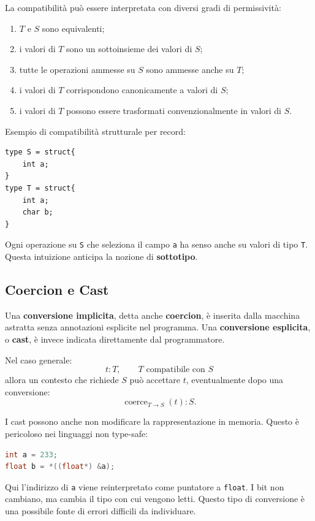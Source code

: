 \documentclass{article}
\begin{document}
La compatibilità può essere interpretata con diversi gradi di permissività:
\begin{enumerate}
  \item $T$ e $S$ sono equivalenti;
  \item i valori di $T$ sono un sottoinsieme dei valori di $S$;
  \item tutte le operazioni ammesse su $S$ sono ammesse anche su $T$;
  \item i valori di $T$ corrispondono canonicamente a valori di $S$;
  \item i valori di $T$ possono essere trasformati convenzionalmente in valori di $S$.
\end{enumerate}

Esempio di compatibilità strutturale per record:

\begin{lstlisting}
type S = struct{
    int a;
}
type T = struct{
    int a;
    char b;
}
\end{lstlisting}

Ogni operazione su \texttt{S} che seleziona il campo \texttt{a} ha senso anche su valori di tipo \texttt{T}. Questa intuizione anticipa la nozione di \textbf{sottotipo}.

\subsection{Coercion e Cast}

Una \textbf{conversione implicita}, detta anche \textbf{coercion}, è inserita dalla macchina astratta senza annotazioni esplicite nel programma. Una \textbf{conversione esplicita}, o \textbf{cast}, è invece indicata direttamente dal programmatore.

Nel caso generale:
\[
t : T,\qquad T \text{ compatibile con } S
\]
allora un contesto che richiede $S$ può accettare $t$, eventualmente dopo una conversione:
\[
\operatorname{coerce}_{T \to S}(t) : S.
\]

I cast possono anche non modificare la rappresentazione in memoria. Questo è pericoloso nei linguaggi non type-safe:

\begin{lstlisting}[language=C]
int a = 233;
float b = *((float*) &a);
\end{lstlisting}

Qui l'indirizzo di \texttt{a} viene reinterpretato come puntatore a \texttt{float}. I bit non cambiano, ma cambia il tipo con cui vengono letti. Questo tipo di conversione è una possibile fonte di errori difficili da individuare.
\end{document}
